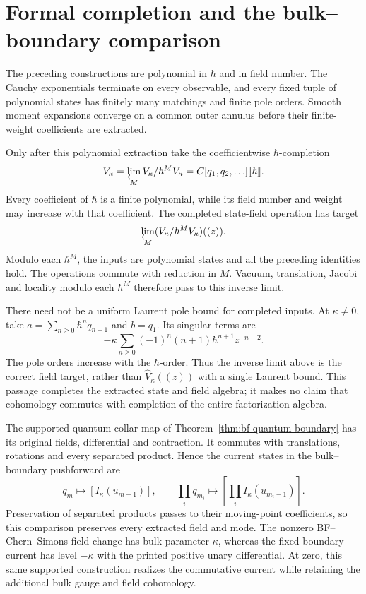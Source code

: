 \section{Formal completion and the bulk--boundary comparison}

The preceding constructions are polynomial in $\hbar$ and in field
number.  The Cauchy exponentials terminate on every observable, and
every fixed tuple of polynomial states has finitely many matchings
and finite pole orders.  Smooth moment expansions converge on a
common outer annulus before their finite-weight coefficients are
extracted.

Only after this polynomial extraction take the coefficientwise
$\hbar$-completion
\[
 V_\kappa
 =\varprojlim_M V_\kappa/\hbar^MV_\kappa
 =C[q_1,q_2,\ldots]\llbracket\hbar\rrbracket.
\]
Every coefficient of $\hbar$ is a finite polynomial, while its field
number and weight may increase with that coefficient.  The completed
state-field operation has target
\[
 \varprojlim_M
       (V_\kappa/\hbar^MV_\kappa)((z)).
\]
Modulo each $\hbar^M$, the inputs are polynomial states and all the
preceding identities hold.  The operations commute with reduction
in $M$.  Vacuum, translation, Jacobi and locality modulo each
$\hbar^M$ therefore pass to this inverse limit.

There need not be a uniform Laurent pole bound for completed inputs.
At $\kappa\ne0$, take
$a=\sum_{n\ge0}\hbar^nq_{n+1}$ and $b=q_1$.
Its singular terms are
\[
 -\kappa\sum_{n\ge0}(-1)^n(n+1)\hbar^{n+1}z^{-n-2}.
\]
The pole orders increase with the $\hbar$-order.  Thus the inverse
limit above is the correct field target, rather than
$\widehat V_\kappa((z))$ with a single Laurent bound.  This passage
completes the extracted state and field algebra; it makes no claim
that cohomology commutes with completion of the entire factorization
algebra.

The supported quantum collar map of
Theorem~\ref{thm:bf-quantum-boundary} has its original fields,
differential and contraction.  It commutes with translations,
rotations and every separated product.  Hence the current states
in the bulk--boundary pushforward are
\[
 q_m\longmapsto[I_\kappa(u_{m-1})],\qquad
 \prod_iq_{m_i}\longmapsto
                  \left[\prod_i I_\kappa(u_{m_i-1})\right].
\]
Preservation of separated products passes to their moving-point
coefficients, so this comparison preserves every extracted field
and mode.  The nonzero BF--Chern--Simons field change has bulk
parameter $\kappa$, whereas the fixed boundary current has level
$-\kappa$ with the printed positive unary differential.  At zero,
this same supported construction realizes the commutative current
while retaining the additional bulk gauge and field cohomology.

